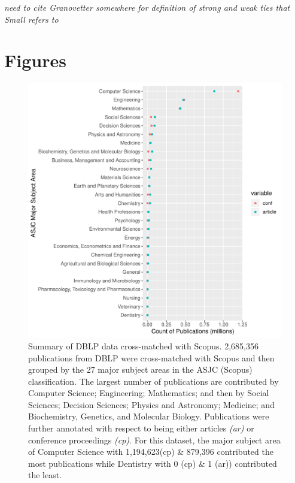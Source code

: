\emph{need to cite Granovetter somewhere for definition of strong and weak ties that Small refers to}
\clearpage

\section*{Figures}

\begin{figure}[ht]
  \includegraphics[scale=0.6]{ar_cp_ratio.pdf}
\caption{Summary of DBLP data cross-matched with Scopus. 2,685,356 publications from DBLP were cross-matched with Scopus and then grouped by the 27 major subject areas in the ASJC (Scopus) classification. The largest number of publications are contributed by Computer Science; Engineering; Mathematics; and then by Social Sciences; Decision Sciences; Physics and Astronomy; Medicine; and Biochemistry, Genetics, and Molecular Biology. Publications were further annotated with respect to being either articles \emph{(ar)} or conference proceedings \emph{(cp)}. For this dataset, the major subject area of Computer Science with 1,194,623(cp) \& 879,396 contributed the most publications while Dentistry with 0 (cp) \& 1 (ar)) contributed the least.}
\label{fig:ar_cp_annotation}       %
\end{figure}

